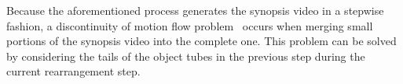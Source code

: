 \documentclass[11pt]{hyu_thesis}
\begin{document}
Because the aforementioned process generates the synopsis video in a stepwise fashion, a discontinuity of motion flow problem~\cite{Fu2014} occurs when merging small portions of the synopsis video into the complete one. This problem can be solved by considering the tails of the object tubes in the previous step during the current rearrangement step.
\begin{figure}
	\centering
	\label{fig:sidewalk}
	\label{fig:crossroadI}
	\label{fig:crossroadII}
	\label{fig:library}

\end{figure}
\end{document}
